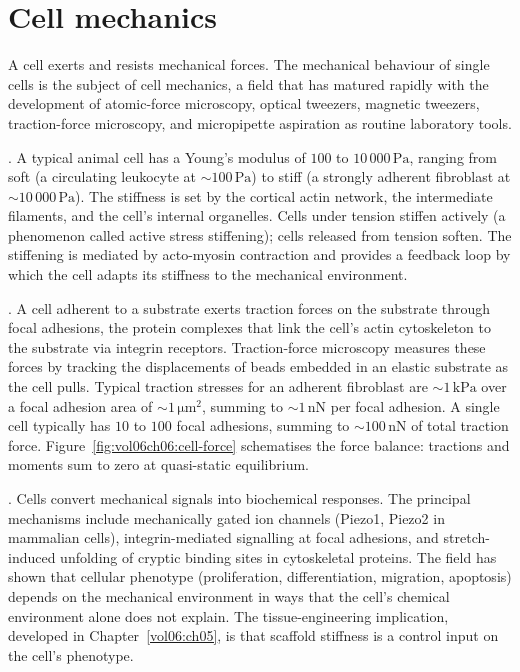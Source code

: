 \section{Cell mechanics}

A cell exerts and resists mechanical forces. The mechanical behaviour
of single cells is the subject of cell mechanics, a field that has
matured rapidly with the development of atomic-force microscopy,
optical tweezers, magnetic tweezers, traction-force microscopy, and
micropipette aspiration as routine laboratory tools.

. A typical animal cell has
a Young's modulus of $100$ to $10\,000\,\text{Pa}$, ranging from
soft (a circulating leukocyte at $\sim 100\,\text{Pa}$) to stiff (a
strongly adherent fibroblast at $\sim 10\,000\,\text{Pa}$). The
stiffness is set by the cortical actin network, the intermediate
filaments, and the cell's internal organelles. Cells under tension
stiffen actively (a phenomenon called active stress stiffening); cells
released from tension soften. The stiffening is mediated by
acto-myosin contraction and provides a feedback loop by which the
cell adapts its stiffness to the mechanical environment.

. A
cell adherent to a substrate exerts traction forces on the substrate
through focal adhesions, the protein complexes that link the cell's
actin cytoskeleton to the substrate via integrin receptors.
Traction-force microscopy measures these forces by tracking the
displacements of beads embedded in an elastic substrate as the cell
pulls. Typical traction stresses for an adherent fibroblast are
$\sim 1\,\text{kPa}$ over a focal adhesion area of
$\sim 1\,\si{\micro\meter}^2$, summing to $\sim 1\,\text{nN}$ per
focal adhesion. A single cell typically has $10$ to $100$ focal
adhesions, summing to $\sim 100\,\text{nN}$ of total traction force.
Figure~\ref{fig:vol06ch06:cell-force} schematises the force balance:
tractions and moments sum to zero at quasi-static equilibrium.



. Cells convert mechanical signals into
biochemical responses. The principal mechanisms include
mechanically gated ion channels (Piezo1, Piezo2 in mammalian cells),
integrin-mediated signalling at focal adhesions, and stretch-induced
unfolding of cryptic binding sites in cytoskeletal proteins. The
field has shown that cellular phenotype (proliferation,
differentiation, migration, apoptosis) depends on the mechanical
environment in ways that the cell's chemical environment alone does
not explain. The tissue-engineering implication, developed in
Chapter~\ref{vol06:ch05}, is that scaffold stiffness is a control
input on the cell's phenotype.

